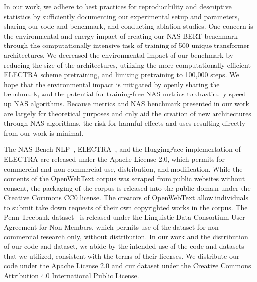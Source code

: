 \documentclass[11pt]{article}
\begin{document}
    In our work, we adhere to best practices for reproducibility and descriptive statistics by sufficiently documenting our experimental setup and parameters, sharing our code and benchmark, and conducting ablation studies. One concern is the environmental and energy impact of creating our NAS BERT benchmark through the computationally intensive task of training of 500 unique transformer architectures. We decreased the environmental impact of our benchmark by reducing the size of the architectures, utilizing the more computationally efficient ELECTRA scheme pretraining, and limiting pretraining to 100,000 steps. We hope that the environmental impact is mitigated by openly sharing the benchmark, and the potential for training-free NAS metrics to drastically speed up NAS algorithms. Because metrics and NAS benchmark presented in our work are largely for theoretical purposes and only aid the creation of new architectures through NAS algorithms, the risk for harmful effects and uses resulting directly from our work is minimal.

    The NAS-Bench-NLP~\cite{klyuchnikov_nas-bench-nlp_2022}, ELECTRA~\cite{clark_electra_2020}, and the HuggingFace implementation of ELECTRA are released under the Apache License 2.0, which permits for commercial and non-commercial use, distribution, and modification. While the contents of the OpenWebText corpus was scraped from public websites without consent, the packaging of the corpus is released into the public domain under the Creative Commons CC0 license. The creators of OpenWebText allow individuals to submit take down requests of their own copyrighted works in the corpus. The Penn Treebank dataset~\cite{marcus_building_1993} is released under the Linguistic Data Consortium User Agreement for Non-Members, which permits use of the dataset for non-commercial research only, without distribution. In our work and the distribution of our code and dataset, we abide by the intended use of the code and datasets that we utilized, consistent with the terms of their licenses. We distribute our code under the Apache License 2.0 and our dataset under the Creative Commons Attribution 4.0 International Public License. 

\clearpage




\clearpage
\appendix
\end{document}

